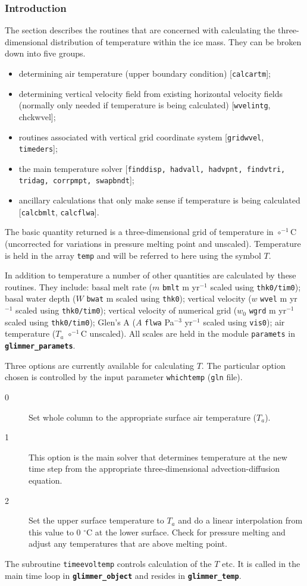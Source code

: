 \subsubsection{Introduction}
The section describes the routines that are concerned with
calculating the three-dimensional distribution of temperature
within the ice mass.  They can be broken down into five groups.
\begin{itemize}
    \item determining air temperature (upper boundary
    condition) [\texttt{calcartm}];
    \item determining vertical velocity field from existing
    horizontal velocity fields (normally only needed if temperature is being calculated) [\texttt{wvelintg}, chckwvel];
    \item routines associated with vertical grid coordinate
    system [\texttt{gridwvel}, \texttt{timeders}];
    \item the main temperature solver [\texttt{finddisp, hadvall, hadvpnt, findvtri, tridag, corrpmpt, swapbndt}];
    \item ancillary calculations that only make sense if temperature is being calculated
    [\texttt{calcbmlt}, \texttt{calcflwa}].
\end{itemize}

The basic quantity returned is a three-dimensional grid of
temperature in $\circ^{-1}$C (uncorrected for variations in
pressure melting point and unscaled).  Temperature is held in the
array \texttt{temp} and will be referred to here using the symbol
$T$.

In addition to temperature a number of other quantities are
calculated by these routines.  They include: basal melt rate ($m$
\texttt{bmlt} m yr$^{-1}$ scaled using \texttt{thk0/tim0}); basal
water depth ($W$ \texttt{bwat} m scaled using \texttt{thk0});
vertical velocity ($w$ \texttt{wvel} m yr$^{-1}$ scaled using
\texttt{thk0/tim0}); vertical velocity of numerical grid ($w_0$
\texttt{wgrd} m yr$^{-1}$ scaled using \texttt{thk0/tim0}); Glen's
A ($A$ \texttt{flwa} Pa$^{-3}$ yr$^{-1}$ scaled using
\texttt{vis0}); air temperature ($T_a$ $\circ^{-1}$C unscaled).
All scales are held in the module \texttt{paramets} in
\textbf{\texttt{glimmer\_paramets}}.

Three options are currently available for calculating $T$. The
particular option chosen is controlled by the input parameter
\texttt{whichtemp} (\texttt{gln} file).

\begin{description}
    \item[0] Set whole column to the appropriate surface air temperature ($T_a$).
    \item[1] This option is the main solver that determines temperature
    at the new time step from the appropriate three-dimensional
    advection-diffusion equation.
    \item[2] Set the upper surface temperature to $T_a$ and do a linear
    interpolation from this value to 0 $^\circ$C at the lower
    surface. Check for pressure melting and adjust any
    temperatures that are above melting point.
\end{description}

The subroutine \texttt{timeevoltemp} controls calculation of the
$T$ etc. It is called in the main time loop in
\textbf{\texttt{glimmer\_object}} and resides in
\textbf{\texttt{glimmer\_temp}}.